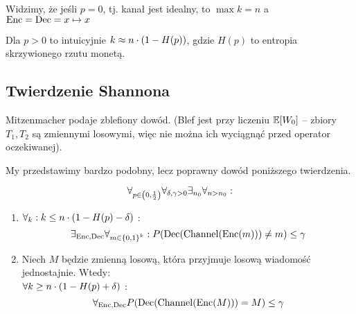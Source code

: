 Widzimy, że jeśli \( p = 0 \), tj. kanał jest idealny, to \( \max k = n \) a \( \operatorname{Enc} = \operatorname{Dec} = x \mapsto x \)

Dla \( p > 0 \) to intuicyjnie \( k \approx n \cdot \left(1 - H(p)\right) \), gdzie \( H(p) \) to entropia skrzywionego rzutu monetą. \\

\subsection{Twierdzenie Shannona}
Mitzenmacher podaje zblefiony dowód. (Blef jest przy liczeniu \(\expected{W_0}\) -- zbiory \(T_1, T_2\) są zmiennymi losowymi, więc nie można ich wyciągnąć przed operator oczekiwanej).

My przedstawimy bardzo podobny, lecz poprawny dowód poniższego twierdzenia.
\begin{theorem} 
    \[
        \forall_{p \in \left(0, \frac{1}{2}\right)}
            \forall_{\delta, \gamma > 0}
                \exists_{n_0}
                    \forall_{n > n_0} :
    \]
    \begin{center}
        \begin{enumerate} \centering
            \item \( \forall_k : k \leq n \cdot \left(1 - H(p) - \delta\right) \) :
            \[
                \exists_{\Enc, \Dec} \forall_{m \in \set{0, 1}^k} : 
                P\pars{\Dec(\Channel(\Enc(m))) \neq m} \leq \gamma
            \]

            \item 
            Niech \( M \) będzie zmienną losową, która przyjmuje losową wiadomość jednostajnie. Wtedy: \\
            \( \forall k \geq n \cdot \left(1 - H(p) + \delta\right) \) :
            \[
                \forall_{\Enc, \Dec} P\pars{\Dec(\Channel(\Enc(M))) = M} \leq \gamma
            \]
        \end{enumerate}
    \end{center}
\end{theorem}

